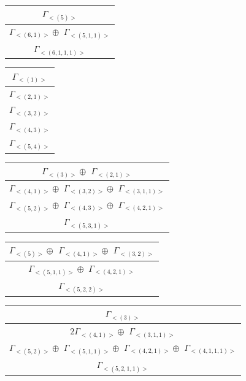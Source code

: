 \begin{minipage}{.3\textwidth}
\centering
\begin{tabular}{|c|}\hline
$\Gamma_{<(
5
)>}$
\\ \hline
$\Gamma_{<(
6 , 
1
)>} \oplus$
$\Gamma_{<(
5 , 
1 , 
1
)>}$
\\ \hline
$\Gamma_{<(
6 , 
1 , 
1 , 
1
)>}$
\\
\hline\end{tabular}\end{minipage}
\begin{minipage}{.3\textwidth}
\centering
\begin{tabular}{|c|}\hline
$\Gamma_{<(
1
)>}$
\\ \hline
$\Gamma_{<(
2 , 
1
)>}$
\\ \hline
$\Gamma_{<(
3 , 
2
)>}$
\\ \hline
$\Gamma_{<(
4 , 
3
)>}$
\\ \hline
$\Gamma_{<(
5 , 
4
)>}$
\\
\hline\end{tabular}\end{minipage}
\bigskip
\begin{minipage}{.5\textwidth}
\centering
\begin{tabular}{|c|}\hline
$\Gamma_{<(
3
)>} \oplus$
$\Gamma_{<(
2 , 
1
)>}$
\\ \hline
$\Gamma_{<(
4 , 
1
)>} \oplus$
$\Gamma_{<(
3 , 
2
)>} \oplus$
$\Gamma_{<(
3 , 
1 , 
1
)>}$
\\ \hline
$\Gamma_{<(
5 , 
2
)>} \oplus$
$\Gamma_{<(
4 , 
3
)>} \oplus$
$\Gamma_{<(
4 , 
2 , 
1
)>}$
\\ \hline
$\Gamma_{<(
5 , 
3 , 
1
)>}$
\\
\hline\end{tabular}\end{minipage}
\begin{minipage}{.5\textwidth}
\centering
\begin{tabular}{|c|}\hline
$\Gamma_{<(
5
)>} \oplus$
$\Gamma_{<(
4 , 
1
)>} \oplus$
$\Gamma_{<(
3 , 
2
)>}$
\\ \hline
$\Gamma_{<(
5 , 
1 , 
1
)>} \oplus$
$\Gamma_{<(
4 , 
2 , 
1
)>}$
\\ \hline
$\Gamma_{<(
5 , 
2 , 
2
)>}$
\\
\hline\end{tabular}\end{minipage}
\bigskip
\begin{minipage}{.6\textwidth}
\centering
\begin{tabular}{|c|}\hline
$\Gamma_{<(
3
)>}$
\\ \hline
$ 2 \Gamma_{<(
4 , 
1
)>} \oplus$
$\Gamma_{<(
3 , 
1 , 
1
)>}$
\\ \hline
$\Gamma_{<(
5 , 
2
)>} \oplus$
$\Gamma_{<(
5 , 
1 , 
1
)>} \oplus$
$\Gamma_{<(
4 , 
2 , 
1
)>} \oplus$
$\Gamma_{<(
4 , 
1 , 
1 , 
1
)>}$
\\ \hline
$\Gamma_{<(
5 , 
2 , 
1 , 
1
)>}$
\\
\hline\end{tabular}\end{minipage}
